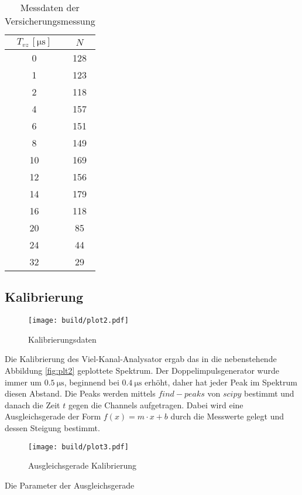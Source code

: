 \begin{table}[H]
	\centering
	\begin{tabular}{c c}
		\toprule
		$T_{vz} \, [\unit{\us}]$ & $N $  \\
		\midrule
        0  & 128 \\
        1  & 123 \\
        2  & 118 \\
        4  & 157 \\ 
        6  & 151 \\
        8  & 149 \\
        10 & 169 \\
        12 & 156 \\
        14 & 179 \\
        16 & 118 \\
        20 & 85  \\ 
        24 & 44  \\
        32 & 29  \\
		\bottomrule
	\end{tabular}
    \caption{Messdaten der Versicherungsmessung}
    \label{tab:data1}
\end{table}

\subsection{Kalibrierung}

\begin{wrapfigure}{r}{0.6\textwidth}
	\centering
	\texttt{[image: build/plot2.pdf]}
	\caption{Kalibrierungsdaten}\label{fig:plt2}
\end{wrapfigure}

Die Kalibrierung des Viel-Kanal-Analysator ergab das in die nebenstehende Abbildung \eqref{fig:plt2} geplottete Spektrum. 
Der Doppelimpulsgenerator wurde immer um $\qty{0.5}{\us}$, beginnend bei $\qty{0.4}{\us}$ erhöht, daher hat jeder Peak im Spektrum diesen Abstand.
Die Peaks werden mittels  $find-peaks$ von $scipy$ \cite{scipy} bestimmt und danach die Zeit $t$ gegen die Channels aufgetragen. 
Dabei wird eine Ausgleichsgerade der Form $f(x)=m \cdot x+b$ durch die Messwerte gelegt und dessen Steigung bestimmt. 


\begin{figure}[H]
	\centering
	\texttt{[image: build/plot3.pdf]}
	\caption{Ausgleichsgerade Kalibrierung}\label{fig:plt3}
\end{figure}


Die Parameter der Ausgleichsgerade

